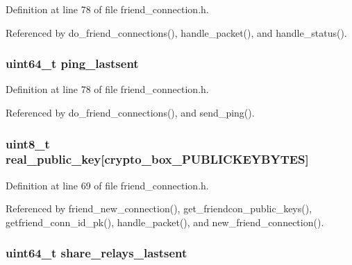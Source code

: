 Definition at line 78 of file friend\+\_\+connection.\+h.



Referenced by do\+\_\+friend\+\_\+connections(), handle\+\_\+packet(), and handle\+\_\+status().

\hypertarget{struct_friend___conn_a1625b76f8f5277e17545953d96b893fb}{
\subsubsection[{ping\+\_\+lastsent}]{\setlength{\rightskip}{0pt plus 5cm}uint64\+\_\+t ping\+\_\+lastsent}}\label{struct_friend___conn_a1625b76f8f5277e17545953d96b893fb}


Definition at line 78 of file friend\+\_\+connection.\+h.



Referenced by do\+\_\+friend\+\_\+connections(), and send\+\_\+ping().

\hypertarget{struct_friend___conn_a996dcaefa2a5954a199e2beb584c1feb}{
\subsubsection[{real\+\_\+public\+\_\+key}]{\setlength{\rightskip}{0pt plus 5cm}uint8\+\_\+t real\+\_\+public\+\_\+key\mbox{[}crypto\+\_\+box\+\_\+\+P\+U\+B\+L\+I\+C\+K\+E\+Y\+B\+Y\+T\+E\+S\mbox{]}}}\label{struct_friend___conn_a996dcaefa2a5954a199e2beb584c1feb}


Definition at line 69 of file friend\+\_\+connection.\+h.



Referenced by friend\+\_\+new\+\_\+connection(), get\+\_\+friendcon\+\_\+public\+\_\+keys(), getfriend\+\_\+conn\+\_\+id\+\_\+pk(), handle\+\_\+packet(), and new\+\_\+friend\+\_\+connection().

\hypertarget{struct_friend___conn_aa5f9fa72527b8eafd6457864f32d2701}{
\subsubsection[{share\+\_\+relays\+\_\+lastsent}]{\setlength{\rightskip}{0pt plus 5cm}uint64\+\_\+t share\+\_\+relays\+\_\+lastsent}}\label{struct_friend___conn_aa5f9fa72527b8eafd6457864f32d2701}



